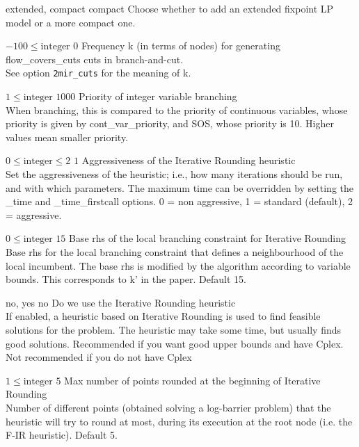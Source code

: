 %
{\ttfamily extended, compact}%
{compact}%
{Choose whether to add an extended fixpoint LP model or a more compact one.}%
{}

%
{$-100\leq\textrm{integer}$}%
{$0$}%
{Frequency k (in terms of nodes) for generating flow\_covers\_cuts cuts in branch-and-cut.\\
See option \texttt{2mir\_cuts} for the meaning of k.}%
{}

%
{$1\leq\textrm{integer}$}%
{$1000$}%
{Priority of integer variable branching\\
When branching, this is compared to the priority of continuous variables, whose priority is given by cont\_var\_priority, and SOS, whose priority is 10. Higher values mean smaller priority.}%
{}

%
{$0\leq\textrm{integer}\leq2$}%
{$1$}%
{Aggressiveness of the Iterative Rounding heuristic\\
Set the aggressiveness of the heuristic; i.e., how many iterations should be run, and with which parameters. The maximum time can be overridden by setting the \_time and \_time\_firstcall options. 0 = non aggressive, 1 = standard (default), 2 = aggressive.}%
{}

%
{$0\leq\textrm{integer}$}%
{$15$}%
{Base rhs of the local branching constraint for Iterative Rounding\\
Base rhs for the local branching constraint that defines a neighbourhood of the local incumbent. The base rhs is modified by the algorithm according to variable bounds. This corresponds to k' in the paper. Default 15.}%
{}

%
{\ttfamily no, yes}%
{no}%
{Do we use the Iterative Rounding heuristic\\
If enabled, a heuristic based on Iterative Rounding is used to find feasible solutions for the problem. The heuristic may take some time, but usually finds good solutions. Recommended if you want good upper bounds and have Cplex. Not recommended if you do not have Cplex}%
{}

%
{$1\leq\textrm{integer}$}%
{$5$}%
{Max number of points rounded at the beginning of Iterative Rounding\\
Number of different points (obtained solving a log-barrier problem) that the heuristic will try to round at most, during its execution at the root node (i.e. the F-IR heuristic). Default 5.}%
{}

